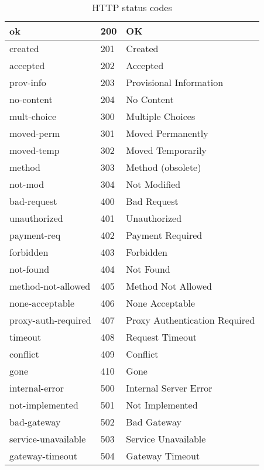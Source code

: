 \begin{table}[htb]
  \centering
  \begin{tabular}{|l|l|l|}
    \hline
   ok &                 200 & OK\\\hline
   created &            201 & Created\\\hline
   accepted &           202 & Accepted\\\hline
   prov-info &          203 & Provisional Information\\\hline
   no-content &         204 & No Content\\\hline

   mult-choice &        300 & Multiple Choices\\\hline
   moved-perm &         301 & Moved Permanently\\\hline
   moved-temp &         302 & Moved Temporarily\\\hline
   method &             303 & Method (obsolete)\\\hline
   not-mod &            304 & Not Modified\\\hline

   bad-request &        400 & Bad Request\\\hline
   unauthorized &       401 & Unauthorized\\\hline
   payment-req &        402 & Payment Required\\\hline
   forbidden &          403 & Forbidden\\\hline
   not-found &          404 & Not Found\\\hline
   method-not-allowed & 405 & Method Not Allowed\\\hline
   none-acceptable &    406 & None Acceptable\\\hline
   proxy-auth-required & 407 & Proxy Authentication Required\\\hline
   timeout &            408 & Request Timeout\\\hline
   conflict &           409 & Conflict\\\hline
   gone &               410 & Gone\\\hline
   internal-error &     500 & Internal Server Error\\\hline
   not-implemented &    501 & Not Implemented\\\hline
   bad-gateway &        502 & Bad Gateway\\\hline
   service-unavailable & 503 & Service Unavailable\\\hline
   gateway-timeout &    504 & Gateway Timeout\\\hline
  \end{tabular}
  \caption{HTTP status codes}
  \label{tab:status-code-names}
\end{table}

